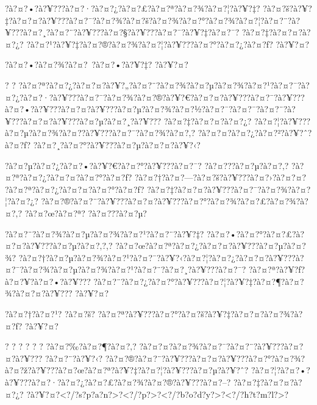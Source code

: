 \documentclass[11pt, openany]{book}
\begin{document}
{{{{{{{{{{?à?¤?•?à?¥???à?¤?·?à?¤?¿?à?¤?£?à?¤?ª?à?¤?¾?à?¤?¦?à?¥?‡?
?à?¤?š?à?¥?‡?à?¤?¤?à?¥???à?¤?¯?à?¤?¾?à?¤?š?à?¤?¾?à?¤?°?à?¤?¾?à?¤?¦?à?¤?¨?à?¥???à?¤?¸?à?¤?¨?à?¥???à?¤?§?à?¥???à?¤?¯?à?¥?‡?à?¤?¯?
?à?¤?‡?à?¤?¤?à?¤?¿?
?à?¤?¹?à?¥?‡?à?¤?®?à?¤?¾?à?¤?¦?à?¥???à?¤?°?à?¤?¿?à?¤?ƒ? ?à?¥?¤?

?à?¤?•?à?¤?¾?à?¤?~?à?¤?•?à?¥?‡? ?à?¥?¤?

? ?
?à?¤?ª?à?¤?¿?à?¤?¤?à?¥?„?à?¤?¨?à?¤?¾?à?¤?µ?à?¤?¾?à?¤?¹?à?¤?¯?à?¤?¿?à?¤?·?à?¥???à?¤?¯?à?¤?¾?à?¤?®?à?¥?€?à?¤?¤?à?¥???à?¤?¯?à?¥???à?¤?•?à?¥???à?¤?¤?à?¥???à?¤?µ?à?¤?¾?à?¤?½?à?¤?¯?à?¤?¯?à?¤?¨?à?¥???à?¤?¤?à?¥???à?¤?µ?à?¤?¸?à?¥???
?à?¤?‡?à?¤?¤?à?¤?¿?
?à?¤?¦?à?¥???à?¤?µ?à?¤?¾?à?¤?­?à?¥???à?¤?¯?à?¤?¾?à?¤?‚?
?à?¤?¤?à?¤?¿?à?¤?²?à?¥?ˆ?à?¤?ƒ? ?à?¤?¸?à?¤?°?à?¥???à?¤?µ?à?¤?¤?à?¥?‹?

?à?¤?µ?à?¤?¿?à?¤?•?à?¥?€?à?¤?°?à?¥???à?¤?¯? ?à?¤???à?¤?µ?à?¤?‚?
?à?¤?ª?à?¤?¿?à?¤?¤?à?¤?°?à?¤?ƒ? ?à?¤?†?à?¤?---?à?¤?š?à?¥???à?¤?›?à?¤?¤?
?à?¤?ª?à?¤?¿?à?¤?¤?à?¤?°?à?¤?ƒ?
?à?¤?‡?à?¤?¤?à?¥???à?¤?¯?à?¤?¾?à?¤?¦?à?¤?¿?
?à?¤?®?à?¤?¨?à?¥???à?¤?¤?à?¥???à?¤?°?à?¤?¾?à?¤?£?à?¤?¾?à?¤?‚?
?à?¤?œ?à?¤?ª? ?à?¤???à?¤?µ?

?à?¤?¨?à?¤?¾?à?¤?µ?à?¤?¾?à?¤?¹?à?¤?¨?à?¥?‡?
?à?¤?•?à?¤?°?à?¤?£?à?¤?¤?à?¥???à?¤?µ?à?¤?‚?,?
?à?¤?œ?à?¤?ª?à?¤?¿?à?¤?¤?à?¥???à?¤?µ?à?¤?¾?
?à?¤?†?à?¤?µ?à?¤?¾?à?¤?¹?à?¤?¯?à?¥?‹?à?¤?¦?à?¤?¿?à?¤?¤?à?¥???à?¤?¯?à?¤?¾?à?¤?µ?à?¤?¾?à?¤?¹?à?¤?¨?à?¤?¸?à?¥???à?¤?¯?
?à?¤?ª?à?¥?ƒ?à?¤?¥?à?¤?•?à?¥???
?à?¤?¨?à?¤?¿?à?¤?°?à?¥???à?¤?¦?à?¥?‡?à?¤?¶?à?¤?¾?à?¤?¤?à?¥??? ?à?¥?¤?

?à?¤?†?à?¤?¹? ?à?¤?š? ?à?¤?ª?à?¥???à?¤?°?à?¤?š?à?¥?‡?à?¤?¤?à?¤?¾?à?¤?ƒ?
?à?¥?¤?

? ? ? ? ? ? ?à?¤?‰?à?¤?¶?à?¤?‚?
?à?¤?¤?à?¤?¾?à?¤?¯?à?¤?¨?à?¥???à?¤?¤?à?¥??? ?à?¤?¨?à?¥?‹?
?à?¤?®?à?¤?¨?à?¥???à?¤?¤?à?¥???à?¤?°?à?¤?¾?à?¤?ž?à?¥???à?¤?œ?à?¤?ª?à?¥?‡?à?¤?¦?à?¥???à?¤?µ?à?¥?ˆ?
?à?¤?¦?à?¤?•?à?¥???à?¤?·?à?¤?¿?à?¤?£?à?¤?¾?à?¤?®?à?¥???à?¤?--?
?à?¤?‡?à?¤?¤?à?¤?¿?
?à?¥?¤?\textless{}?/?s?p?a?n?\textgreater{}?\textless{}?/?p?\textgreater{}?\textless{}?/?b?o?d?y?\textgreater{}?\textless{}?/?h?t?m?l?\textgreater{}?

}}}}}}}}}}
\end{document}
